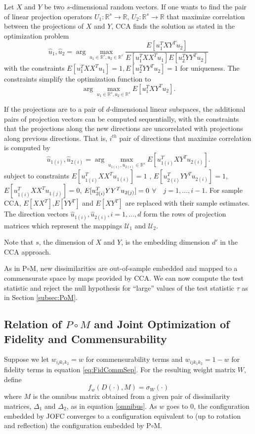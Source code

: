 \documentclass[11pt]{article} %
\begin{document}
 Let $X$ and $Y$ be two $s$-dimensional random vectors. If  one wants to find  the pair of linear projection operators $U_1:\mathbb{R}^s \rightarrow  \mathbb{R}$, $U_2 :\mathbb{R}^s \rightarrow  \mathbb{R}$ that maximize correlation between the projections of   $X$ and $Y$, CCA finds the solution as stated in the  optimization problem
$$
{\hat{u}_1 ,\hat{u}_2}=\arg\max_{u_1\in\mathbb{R}^s,u_2\in\mathbb{R}^s} {\frac{E[u_1^{T}XY^Tu_2]}{{E[u_1^{T}XX^T u_1]}{E[u_2^{T}YY^T u_2]}}}$$
with the constraints $E[{u_1^{T}XX^T u_1}]=1 , E[{u_2^{T}YY^T u_2}]=1$ for uniqueness. The constraints simplify the optimization function to $$
\arg\max_{u_1\in \mathbb{R}^s,u_2\in \mathbb{R}^s} {E[u_1^{T}XY^Tu_2]}.$$

If the projections are to a pair of $d$-dimensional linear subspaces, the additional pairs of projection vectors can be computed sequentially, with the constraints that the projections along the new directions are uncorrelated with  projections along previous directions. That is, $i^{th}$ pair of directions  that maximize correlation is computed by 
$$
{\hat{u}_{1(i)},\hat{u}_{2(i)}}=\arg\max_{u_{1(i)},u_{2(i)}\in\mathbb{R}^s} {E[u_{1(i)}^{T}XY^Tu_{2(i)}]}.$$ subject to constraints $E[{u_{1(i)}^{T}XX^T u_{1(i)}}]=1$ , $E[{u_{2(i)}^{T}YY^T u_{2(i)}}]=1$, $E[{u_{1(i)}^{T}XX^T u_{1(j)}}]=0$,  
   $ E[{u_{2(i)}^{T}YY^T u_{2(j)}}]=\nolinebreak0$ $\forall \quad  j=1,\ldots,i-1$. For sample CCA, $E[XX^T]$,$E[YY^T]$ and $E[XY^T]$ are replaced with their sample estimates. The direction vectors ${\hat{u}_{1(i)},\hat{u}_{2(i)}}, i=1,\ldots,d $ form the rows of projection matrices which represent the mappings $\mathcal{U}_1$ and $\mathcal{U}_2$. 


Note that $s$, the dimension of $X$ and $Y$, is the embedding dimension $d'$  in the CCA approach. 


As in P$ \circ $M, new dissimilarities are out-of-sample embedded and mapped to a commensurate  space by maps provided by CCA. We can now compute the test statistic  and reject the null hypothesis for ``large'' values of the test statistic $\tau$  as in Section \ref{subsec:PoM}.


\subsection{Relation of $P\circ M$ and Joint Optimization of Fidelity and Commensurability} 

Suppose we let $w_{ijk_1k_2}=w$ for commensurability terms and $w_{ijk_1k_2}=1-w$ for fidelity terms in equation \eqref{eq:FidCommSep}. For the resulting weight matrix $W$, define 
\begin{equation}
f_w(D(\cdot),M) = \sigma_W(\cdot) \label{fid-comm-tradeoff-func}
\end{equation}
 where $M$ is the omnibus matrix obtained from  a given pair of dissimilarity matrices, $\Delta_1$ and $\Delta_2$, as in equation \eqref{omnibus}.   As $w$ goes to 0, the configuration embedded by JOFC converges to a configuration equivalent to (up to rotation and reflection)  the configuration embedded by P$\circ$M.
\end{document}
